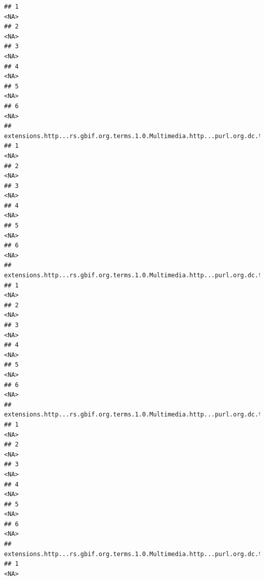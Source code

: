 \documentclass[
]{book}
\begin{document}
\begin{verbatim}
## 1                                                                                  <NA>
## 2                                                                                  <NA>
## 3                                                                                  <NA>
## 4                                                                                  <NA>
## 5                                                                                  <NA>
## 6                                                                                  <NA>
##   extensions.http...rs.gbif.org.terms.1.0.Multimedia.http...purl.org.dc.terms.created.4
## 1                                                                                  <NA>
## 2                                                                                  <NA>
## 3                                                                                  <NA>
## 4                                                                                  <NA>
## 5                                                                                  <NA>
## 6                                                                                  <NA>
##   extensions.http...rs.gbif.org.terms.1.0.Multimedia.http...purl.org.dc.terms.format.4
## 1                                                                                 <NA>
## 2                                                                                 <NA>
## 3                                                                                 <NA>
## 4                                                                                 <NA>
## 5                                                                                 <NA>
## 6                                                                                 <NA>
##   extensions.http...rs.gbif.org.terms.1.0.Multimedia.http...purl.org.dc.terms.references.4
## 1                                                                                     <NA>
## 2                                                                                     <NA>
## 3                                                                                     <NA>
## 4                                                                                     <NA>
## 5                                                                                     <NA>
## 6                                                                                     <NA>
##   extensions.http...rs.gbif.org.terms.1.0.Multimedia.http...purl.org.dc.terms.creator.4
## 1                                                                                  <NA>

\end{verbatim}
\end{document}

